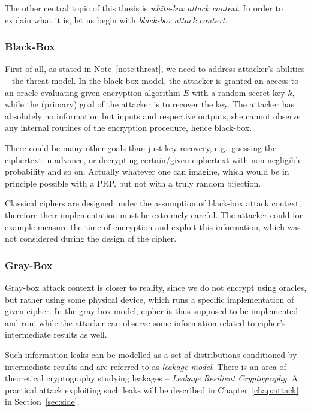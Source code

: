 The other central topic of this thesis is {\em white-box attack context}. In order to explain what it is, let us begin with {\em black-box attack context}.

\subsubsection{Black-Box}

First of all, as stated in Note~\ref{note:threat}, we need to address attacker's abilities -- the threat model. In the black-box model, the attacker is granted an access to an oracle evaluating given encryption algorithm $E$ with a random secret key $k$, while the (primary) goal of the attacker is to recover the key. The attacker has absolutely no information but inputs and respective outputs, she cannot observe any internal routines of the encryption procedure, hence black-box.

\begin{note}
	There could be many other goals than just key recovery, e.g.\ guessing the ciphertext in advance, or decrypting certain/given ciphertext with non-negligible probability and so on. Actually whatever one can imagine, which would be in principle possible with a PRP, but not with a truly random bijection.
\end{note}

Classical ciphers are designed under the assumption of black-box attack context, therefore their implementation must be extremely careful. The attacker could for example measure the time of encryption and exploit this information, which was not considered during the design of the cipher.

\subsubsection{Gray-Box}

Gray-box attack context is closer to reality, since we do not encrypt using oracles, but rather using some physical device, which runs a specific implementation of given cipher. In the gray-box model, cipher is thus supposed to be implemented and run, while the attacker can observe some information related to cipher's intermediate results as well.

Such information leaks can be modelled as a set of distributions conditioned by intermediate results and are referred to as {\em leakage model}. There is an area of theoretical cryptography studying leakages -- {\em Leakage Resilient Cryptography}. A practical attack exploiting such leaks will be described in Chapter~\ref{chap:attack} in Section~\ref{sec:side}.

